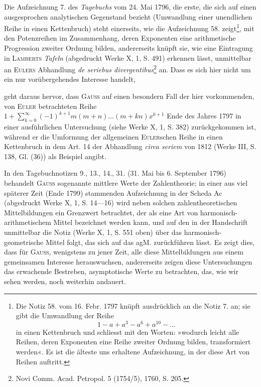 Die Aufzeichnung 7. des \textit{Tagebuchs} vom 24. Mai 1796, die erste, die sich
auf einen ausgesprochen analytischen Gegenstand bezieht (Umwandlung einer
unendlichen Reihe in einen Kettenbruch) steht einerseits, wie die Aufzeichnung
58. zeigt\footnote{Die Notiz 58. vom 16. Febr. 1797 knüpft ausdrücklich an die Notiz 7. an; sie gibt die Umwandlung der Reihe
\[
1-a+a^3-a^6+a^{10}-\ldots
\]
in einen Kettenbruch und schliesst mit den Worten: »wodurch leicht alle Reihen, deren Exponenten eine Reihe zweiter Ordnung bilden, transformiert werden«. Es ist die älteste uns erhaltene Aufzeichnung, in der diese Art von Reihen auftritt.},
mit den Potenzreihen im Zusammenhang, deren Exponenten
eine arithmetische Progression zweiter Ordnung bilden, andererseits knüpft
sie, wie eine Eintragung in \textsc{Lamberts} \textit{Tafeln} (abgedruckt Werke X, 1, S. 491)
erkennen lässt, unmittelbar an \textsc{Eulers} Abhandlung \textit{de seriebus divergentibus}\footnote{Novi Comm. Acad. Petropol. 5 (1754/5), 1760, S. 205.}
an. Dass es sich hier nicht um ein nur vorübergehendes Interesse handelt,\par
\clearpage{}
\noindent geht daraus hervor, dass \textsc{Gauss} auf einen besondern Fall der hier vorkommenden,
von \textsc{Euler} betrachteten Reihe \(1+\displaystyle\sum_{k=0}^{\infty}(-1)^{k+1}m(m+n)\ldots(m+kn)x^{k+1}\) Ende
des Jahres 1797 in einer ausführlichen Untersuchung (siehe Werke X, 1,
S. 382) zurückgekommen ist, während er die Umformung der allgemeinen
\textsc{Euler}schen Reihe in einen Kettenbruch in dem Art. 14 der Abhandlung
\textit{circa seriem} von 1812 (Werke III, S. 138, Gl. (36)) als Beispiel angibt.

In den Tagebuchnotizen 9., 13., 14., 31. (31. Mai bis 6. September 1796)
behandelt \textsc{Gauss} sogenannte mittlere Werte der Zahlentheorie; in einer aus viel
späterer Zeit (Ende 1799) stammenden Aufzeichnung in der Scheda Ac (abgedruckt
Werke X, 1, S. 14—16) wird neben solchen zahlentheoretischen
Mittelbildungen ein Grenzwert betrachtet, der als eine Art von harmonisch-arithmetischem
Mittel bezeichnet werden kann, und auf den in der Handschrift
unmittelbar die Notiz (Werke X, 1, S. 551 oben) über das harmonisch-geometrische
Mittel folgt, das sich auf das agM. zurückführen lässt. Es zeigt
dies, dass für \textsc{Gauss}, wenigstens zu jener Zeit, alle diese Mittelbildungen aus
einem gemeinsamen Interesse herauswuchsen, andererseits zeigen diese Untersuchungen
das erwachende Bestreben, asymptotische Werte zu betrachten, das, wie
wir sehen werden, noch weiterhin andauert.

